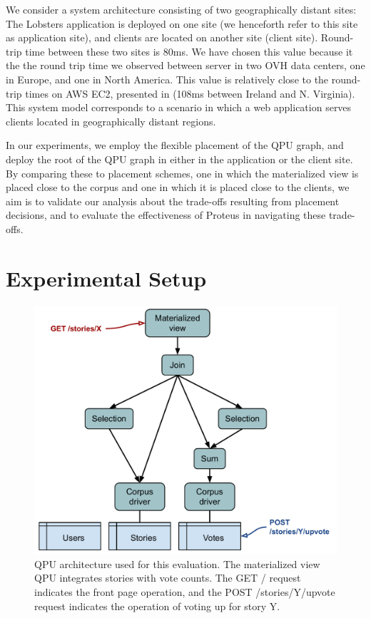 \bigskip
\noindent
We consider a system architecture consisting of two geographically distant sites:
The Lobsters application is deployed on one site (we henceforth refer to this site as application site),
and clients are located on another site (client site).
Round-trip time between these two sites is 80ms.
We have chosen this value because it the the round trip time we observed between server in two OVH data centers,
one in Europe, and one in North America.
This value is relatively close to the round-trip times on AWS EC2, presented in \cite{pbailis:hats} (108ms between Ireland and N. Virginia).
This system model corresponds to a scenario in which a web application serves clients located in geographically distant regions.

In our experiments, we employ the flexible placement of the QPU graph,
and deploy the root of the QPU graph in either in the application or the client site.
By comparing these to placement schemes, one in which the materialized view is placed close to the corpus and one in which
it is placed close to the clients, we aim is to validate our analysis about the trade-offs resulting from placement decisions,
and to evaluate the effectiveness of Proteus in navigating these trade-offs.

\section{Experimental Setup}

\begin{figure}[t]
  \centering
    \includegraphics[scale=0.5]{./figures/case_studies/lobsters_architecture_basic.pdf}
  \caption{QPU architecture used for this evaluation. The materialized view QPU integrates stories with vote counts.
  The GET / request indicates the front page operation, and the POST /stories/Y/upvote request indicates the operation of voting up for story Y.}
  \label{fig:eval_lobsters_qpu_arch}
\end{figure}

